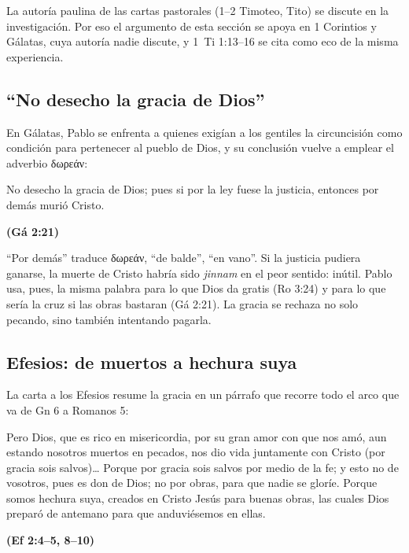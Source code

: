 \documentclass[11pt,letterpaper]{article}
\newcommand{\grc}[1]{\foreignlanguage{ancientgreek}{#1}}
\newcommand{\fuente}[1]{\par\hfill{\upshape\bfseries\small\textcolor{azul}{#1}}}
\begin{document}
\begin{nota}[Precisión]
La autoría paulina de las cartas pastorales (1--2 Timoteo, Tito) se discute en la investigación. Por eso el argumento de esta sección se apoya en 1 Corintios y Gálatas, cuya autoría nadie discute, y 1~Ti 1:13--16 se cita como eco de la misma experiencia.
\end{nota}

\subsection{``No desecho la gracia de Dios''}
En Gálatas, Pablo se enfrenta a quienes exigían a los gentiles la circuncisión como condición para pertenecer al pueblo de Dios, y su conclusión vuelve a emplear el adverbio \grc{δωρεάν}:

\begin{cita}No desecho la gracia de Dios; pues si por la ley fuese la justicia, entonces por demás murió Cristo.\fuente{(Gá 2:21)}\end{cita}

``Por demás'' traduce \grc{δωρεάν}, ``de balde'', ``en vano''. Si la justicia pudiera ganarse, la muerte de Cristo habría sido \emph{jinnam} en el peor sentido: inútil. Pablo usa, pues, la misma palabra para lo que Dios da gratis (Ro 3:24) y para lo que sería la cruz si las obras bastaran (Gá 2:21). La gracia se rechaza no solo pecando, sino también intentando pagarla.

\subsection{Efesios: de muertos a hechura suya}
La carta a los Efesios resume la gracia en un párrafo que recorre todo el arco que va de Gn 6 a Romanos 5:

\begin{cita}Pero Dios, que es rico en misericordia, por su gran amor con que nos amó, aun estando nosotros muertos en pecados, nos dio vida juntamente con Cristo (por gracia sois salvos)\ldots{} Porque por gracia sois salvos por medio de la fe; y esto no de vosotros, pues es don de Dios; no por obras, para que nadie se gloríe. Porque somos hechura suya, creados en Cristo Jesús para buenas obras, las cuales Dios preparó de antemano para que anduviésemos en ellas.\fuente{(Ef 2:4--5, 8--10)}\end{cita}
\end{document}
